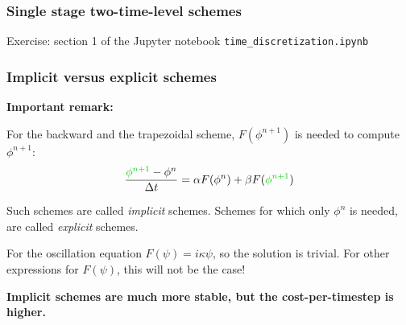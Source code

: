 \documentclass[aspectratio=43,9pt]{beamer}
\begin{document}
%
%
%
\begin{frame}
	\frametitle{Single stage two-time-level schemes}
	Exercise: section 1 of the Jupyter notebook \texttt{time\_discretization.ipynb}
\end{frame}
%
%
\begin{frame}
	\frametitle{Implicit versus explicit schemes}
	\textbf{Important remark:}
	\par\vspace*{3ex}
	For the backward and the trapezoidal scheme, $F(\phi^{n+1})$ is needed to compute $\phi^{n+1}$:
	\begin{equation*}
		\frac{\textcolor{green!80!black}{\phi^{n+1}}-\phi^n}{\Delta t}=\alpha F(\phi^n)+\beta F(\textcolor{green!80!black}{\phi^{n+1}})
	\end{equation*}
	\par\vspace*{2ex}
	Such schemes are called \emph{implicit} schemes. Schemes for which only $\phi^n$ is needed, are called \emph{explicit} schemes.
	\par\vspace*{4ex}
	For the oscillation equation $F(\psi)=i\kappa\psi$, so the solution is trivial. For other expressions for $F(\psi)$, this will not be the case!
\pause
	\par\vspace*{4ex}
	\textbf{Implicit schemes are much more stable, but the cost-per-timestep is higher.}
\end{frame}
%
%
\end{document}
